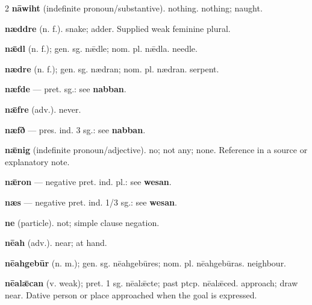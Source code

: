 \begin{multicols*}{2}
\textbf{nāwiht} (indefinite pronoun/substantive). nothing. nothing; naught.\par
\textbf{næddre} (n. f.). snake; adder. Supplied weak feminine plural.\par
\textbf{nǣdl} (n. f.); gen. sg. nǣdle; nom. pl. nǣdla. needle.\par
\textbf{nædre} (n. f.); gen. sg. nædran; nom. pl. nædran. serpent.\par
\textbf{næfde} — pret. sg.: see \textbf{nabban}.\par
\textbf{nǣfre} (adv.). never.\par
\textbf{næfð} — pres. ind. 3 sg.: see \textbf{nabban}.\par
\textbf{nǣnig} (indefinite pronoun/adjective). no; not any; none. Reference in a source or explanatory note.\par
\textbf{nǣron} — negative pret. ind. pl.: see \textbf{wesan}.\par
\textbf{næs} — negative pret. ind. 1/3 sg.: see \textbf{wesan}.\par
\textbf{ne} (particle). not; simple clause negation.\par
\textbf{nēah} (adv.). near; at hand.\par
\textbf{nēahgebūr} (n. m.); gen. sg. nēahgebūres; nom. pl. nēahgebūras. neighbour.\par
\textbf{nēalǣcan} (v. weak); pret. 1 sg. nēalǣcte; past ptcp. nēalǣced. approach; draw near. Dative person or place approached when the goal is expressed.\par

\end{multicols*}
